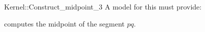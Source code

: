 \begin{ccRefFunctionObjectConcept}{Kernel::Construct_midpoint_3}
A model for this must provide:


 {computes the midpoint of the segment $pq$.}

\end{ccRefFunctionObjectConcept}
